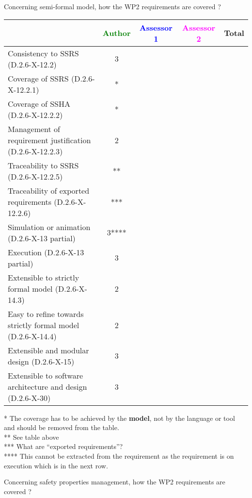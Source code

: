 Concerning semi-formal model, how the WP2 requirements are covered ?

\begin{tabular}{|l | c | c | c | c|}
\hline
& \textcolor{green}{Author} & \textcolor{blue}{Assessor 1} & \textcolor{magenta}{Assessor 2} & Total \\
\hline 
Consistency to SSRS (D.2.6-X-12.2) &3 & & &  \\
\hline
Coverage of SSRS (D.2.6-X-12.2.1)  &* & & &  \\
\hline
Coverage of SSHA (D.2.6-X-12.2.2)  &* & & &  \\
\hline
Management of requirement justification (D.2.6-X-12.2.3)  &2 & & &  \\
\hline
Traceability to  SSRS (D.2.6-X-12.2.5)  &** & & &  \\
\hline
Traceability of exported requirements (D.2.6-X-12.2.6)  &*** & & &  \\
\hline
Simulation or animation (D.2.6-X-13 partial)  &3**** & & &  \\
\hline
Execution (D.2.6-X-13 partial)  &3 & & &  \\
\hline
Extensible to strictly formal model (D.2.6-X-14.3) &2 & & &  \\
\hline
Easy to  refine towards strictly formal model (D.2.6-X-14.4) &2 & & &  \\
\hline
Extensible and modular design (D.2.6-X-15)  &3 & & &  \\
\hline
Extensible to software architecture and design (D.2.6-X-30)   &3 & & &  \\
\hline
\end{tabular}

\begin{author_comment}
* The coverage has to be achieved by the \textbf{model}, not by the language or tool and should be removed from the table.\\
** See table above\\
*** What are ``exported requirements''?\\
**** This cannot be extracted from the requirement as the requirement is on execution which is in the next row.
\end{author_comment}

Concerning safety properties management, how the WP2 requirements are covered ?

